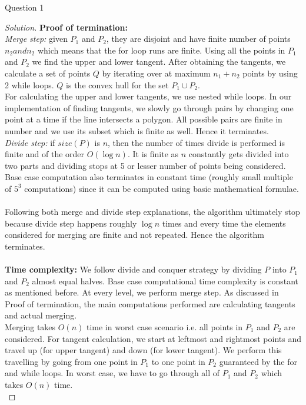 \begin{solution}{Question 1}
\begin{proof}[Solution]
        \textbf{Proof of termination:}\\
        \textit{Merge step:} given $P_1$ and $P_2$, they are disjoint and have finite number of points $n_2 and n_2$ which means that the for loop runs are finite. Using all the points in $P_1$ and $P_2$ we find the upper and lower tangent. After obtaining the tangents, we calculate a set of points $Q$ by iterating over at maximum $n_1+n_2$ points by using 2 while loops. $Q$ is the convex hull for the set $P_1\cup P_2$.\\
        For calculating the upper and lower tangents, we use nested while loops. In our implementation of finding tangents, we slowly go through pairs by changing one point at a time if the line intersects a polygon. All possible pairs are finite in number and we use its subset which is finite as well. Hence it terminates.
        \\
        \textit{Divide step:} if $size(P)$ is $n$, then the number of times divide is performed is finite and of the order $O(\log n)$. It is finite as $n$ constantly gets divided into two parts and dividing stops at 5 or lesser number of points being considered. Base case computation also terminates in constant time (roughly small multiple of $5^3$ computations) since it can be computed using basic mathematical formulae.\\
        \\
        Following both merge and divide step explanations, the algorithm ultimately stop because divide step happens roughly $\log n$ times and every time the elements considered for merging are finite and not repeated. Hence the algorithm terminates.\\
        \\
        \textbf{Time complexity:}
        We follow divide and conquer strategy by dividing $P$ into $P_1$ and $P_2$ almost equal halves. Base case computational time complexity is constant as mentioned before. At every level, we perform merge step. As discussed in Proof of termination, the main computations performed are calculating tangents and actual merging.\\
        Merging takes $O(n)$ time in worst case scenario i.e. all points in $P_1$ and $P_2$ are considered. For tangent calculation, we start at leftmost and rightmost points and travel up (for upper tangent) and down (for lower tangent). We perform this travelling by going from one point in $P_1$ to one point in $P_2$ guaranteed by the for and while loops. In worst case, we have to go through all of $P_1$ and $P_2$ which takes $O(n)$ time.\\

\end{proof}
\end{solution}
